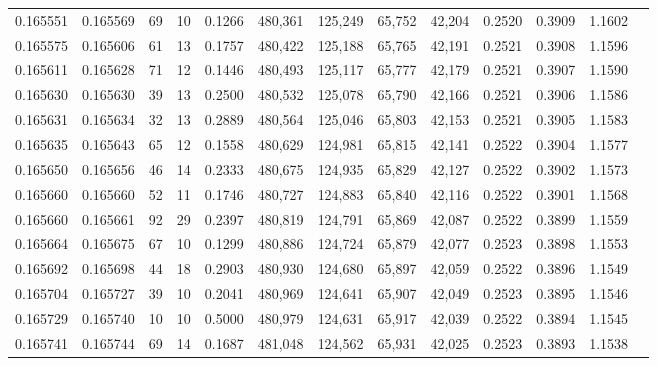 \begin{tabular}{rrrrrrrrrrrrr}
0.165551 & 0.165569 &    69 &  10 &                                     0.1266 & 480,361 & 125,249 &  65,752 &  42,204 & 0.2520 & 0.3909 & 1.1602 \\
0.165575 & 0.165606 &    61 &  13 &                                     0.1757 & 480,422 & 125,188 &  65,765 &  42,191 & 0.2521 & 0.3908 & 1.1596 \\
0.165611 & 0.165628 &    71 &  12 &                                     0.1446 & 480,493 & 125,117 &  65,777 &  42,179 & 0.2521 & 0.3907 & 1.1590 \\
0.165630 & 0.165630 &    39 &  13 &                                     0.2500 & 480,532 & 125,078 &  65,790 &  42,166 & 0.2521 & 0.3906 & 1.1586 \\
0.165631 & 0.165634 &    32 &  13 &                                     0.2889 & 480,564 & 125,046 &  65,803 &  42,153 & 0.2521 & 0.3905 & 1.1583 \\
0.165635 & 0.165643 &    65 &  12 &                                     0.1558 & 480,629 & 124,981 &  65,815 &  42,141 & 0.2522 & 0.3904 & 1.1577 \\
0.165650 & 0.165656 &    46 &  14 &                                     0.2333 & 480,675 & 124,935 &  65,829 &  42,127 & 0.2522 & 0.3902 & 1.1573 \\
0.165660 & 0.165660 &    52 &  11 &                                     0.1746 & 480,727 & 124,883 &  65,840 &  42,116 & 0.2522 & 0.3901 & 1.1568 \\
0.165660 & 0.165661 &    92 &  29 &                                     0.2397 & 480,819 & 124,791 &  65,869 &  42,087 & 0.2522 & 0.3899 & 1.1559 \\
0.165664 & 0.165675 &    67 &  10 &                                     0.1299 & 480,886 & 124,724 &  65,879 &  42,077 & 0.2523 & 0.3898 & 1.1553 \\
0.165692 & 0.165698 &    44 &  18 &                                     0.2903 & 480,930 & 124,680 &  65,897 &  42,059 & 0.2522 & 0.3896 & 1.1549 \\
0.165704 & 0.165727 &    39 &  10 &                                     0.2041 & 480,969 & 124,641 &  65,907 &  42,049 & 0.2523 & 0.3895 & 1.1546 \\
0.165729 & 0.165740 &    10 &  10 &                                     0.5000 & 480,979 & 124,631 &  65,917 &  42,039 & 0.2522 & 0.3894 & 1.1545 \\
0.165741 & 0.165744 &    69 &  14 &                                     0.1687 & 481,048 & 124,562 &  65,931 &  42,025 & 0.2523 & 0.3893 & 1.1538 \\

\end{tabular}

